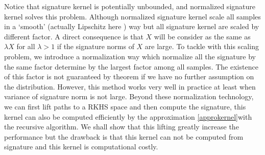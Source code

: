 \documentclass[12pt]{report}
\theoremstyle{definition}
\theoremstyle{remark}
\begin{document}
Notice that signature kernel is potentially unbounded, and normalized signature kernel solves this problem. Although normalized signature kernel scale all samples in a `smooth' (actually Lipschitz here ) way but all signature kernel are scaled by different factor. A direct consequence is that $X$ will be consider as the same as $\lambda X$ for all $\lambda > 1$ if the signature norms of $X$ are large. To tackle with this scaling problem, we introduce a normalization way which normalize all the signature by the same factor determine by the largest factor among all samples. The existence of this factor is not guaranteed by theorem if we have no further assumption on the distribution. However, this method works very well in practice at least when variance of signature norm is not large. Beyond these normalization technology, we can first lift paths to a RKHS space and then compute the signature, this kernel can also be computed efficiently by the approximation \eqref{approkernel}with the recursive algorithm. We shall show that this lifting greatly increase the performance but the drawback is that this kernel can not be computed from signature and this kernel is computational costly. 
\end{document}
